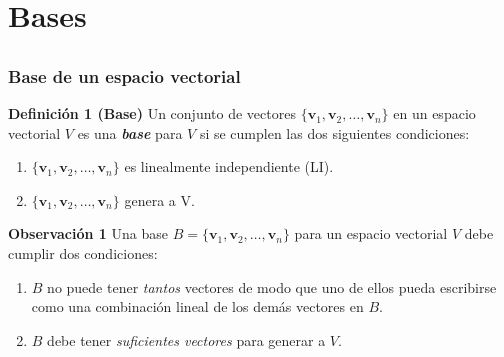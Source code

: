 \section{Bases}

\subsection{}

{\nologo
\begin{frame}\frametitle{Base de un espacio vectorial}

\begin{block}{\textbf{Definición 1 (Base)}}
	\justifying
	Un conjunto de vectores $\{\mathbf{v}_1, \mathbf{v}_2, \hdots , \mathbf{v}_n \}$ en un espacio vectorial $V$ es 
	una \textbf{\textit{base}} para $V$ si se cumplen las dos siguientes condiciones:
	\begin{enumerate}
		\item[\labelname{$a$}] $\{\mathbf{v}_1, \mathbf{v}_2, \hdots , \mathbf{v}_n \}$ es linealmente independiente (LI).
		\item[\labelname{$b$}] $\{\mathbf{v}_1, \mathbf{v}_2, \hdots , \mathbf{v}_n \}$ genera a V.
	\end{enumerate}
\end{block}


\begin{alertblock}{\textbf{Observación 1}}
Una base $B=\{\mathbf{v}_1, \mathbf{v}_2, \hdots , \mathbf{v}_n \}$ para un espacio vectorial $V$ debe cumplir dos condiciones:
\begin{enumerate}	
	\item[\labelname{$a$}] $B$ no puede tener \textit{tantos} vectores de modo que uno de ellos pueda escribirse
	como una combinación lineal de los demás vectores en $B$.
	\item[\labelname{$b$}] $B$ debe tener \textit{suficientes vectores} para generar a $V$.
\end{enumerate}
\end{alertblock}	

\end{frame}
}


\subsection{}

